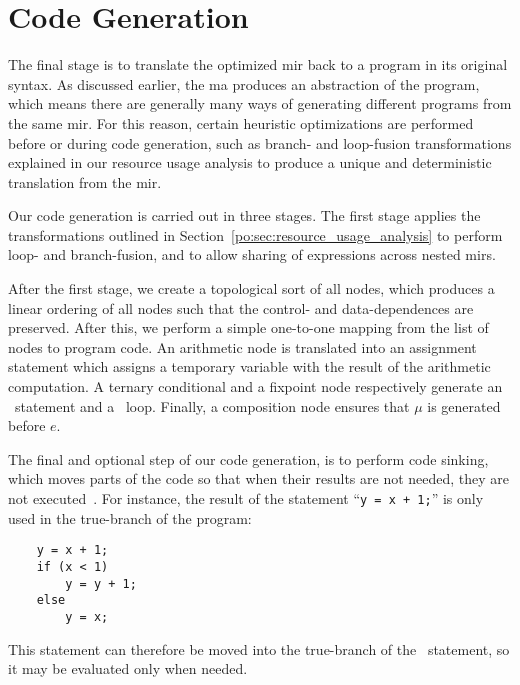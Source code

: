 \section{Code Generation}
\label{po:sec:code_generation}

The final stage is to translate the optimized \gls{mir} back to a program
in its original syntax.  As discussed earlier, the \gls{ma} produces an
abstraction of the program, which means there are generally many ways of
generating different programs from the same \gls{mir}\@.  For this reason,
certain heuristic optimizations are performed before or during code generation,
such as branch- and loop-fusion transformations explained in our resource
usage analysis to produce a unique and deterministic translation from the
\gls{mir}\@.

Our code generation is carried out in three stages.  The first stage applies
the transformations outlined in Section~\ref{po:sec:resource_usage_analysis}
to perform loop- and branch-fusion, and to allow sharing of expressions across
nested \glspl{mir}.

After the first stage, we create a topological sort of all nodes, which
produces a linear ordering of all nodes such that the control- and
data-dependences are preserved.  After this, we perform a simple one-to-one
mapping from the list of nodes to program code.  An arithmetic node is
translated into an assignment statement which assigns a temporary variable with
the result of the arithmetic computation.  A ternary conditional and a fixpoint
node respectively generate an \iflit~statement and a \whilelit~loop.  Finally,
a composition node  ensures that $\mu$ is
generated before $e$.

The final and optional step of our code generation, is to perform code sinking,
which moves parts of the code so that when their results are not needed, they
are not executed~\cite{llvm}.  For instance, the result of the statement
``\lstinline[basicstyle=\tt]{y = x + 1;}''
is only used in the true-branch of the program:
\begin{lstlisting}
    y = x + 1;
    if (x < 1)
        y = y + 1;
    else
        y = x;
\end{lstlisting}
This statement can therefore be moved into the true-branch of the
\iflit~statement, so it may be evaluated only when needed.
